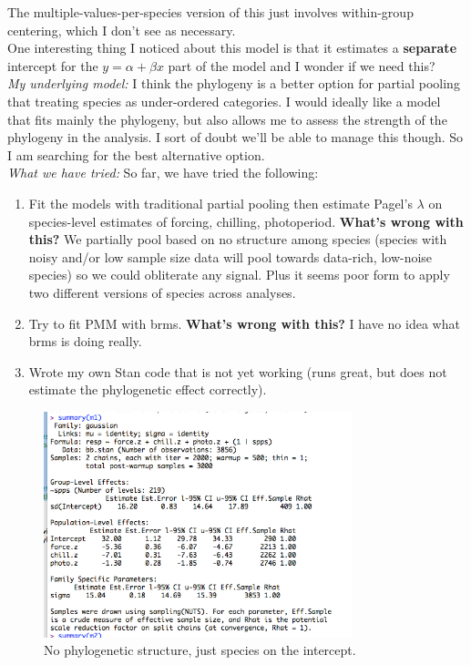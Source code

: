 \documentclass[11pt,letter]{article}
\begin{document}
The multiple-values-per-species version of this just involves within-group centering, which I don't see as necessary. \\

One interesting thing I noticed about this model is that it estimates a {\bf separate} intercept for the $y = \alpha + \beta x$ part of the model and I wonder if we need this?\\

\emph{My underlying model:} I think the phylogeny is a better option for partial pooling that treating species as under-ordered categories. I would ideally like a model that fits mainly the phylogeny, but also allows me to assess the strength of the phylogeny in the analysis. I sort of doubt we'll be able to manage this though. So I am searching for the best alternative option. \\

\emph{What we have tried:} So far, we have tried the following:
\begin{enumerate}
\item Fit the models with traditional partial pooling then estimate Pagel's $\lambda$ on species-level estimates of forcing, chilling, photoperiod. {\bf What's wrong with this?} We partially pool based on no structure among species (species with noisy and/or low sample size data will pool towards data-rich, low-noise species) so we could obliterate any signal. Plus it seems poor form to apply two different versions of species across analyses.
\item Try to fit PMM with brms. {\bf What's wrong with this?} I have no idea what brms is doing really.
\item Wrote my own Stan code that is not yet working (runs great, but does not estimate the phylogenetic effect correctly).  
\end{enumerate}

\begin{figure}[h!]
\centering
\noindent \includegraphics[width=0.8\textwidth]{figures/brms_m1.png} 
\caption{No phylogenetic structure, just species on the intercept.}
\end{figure}
\end{document}
